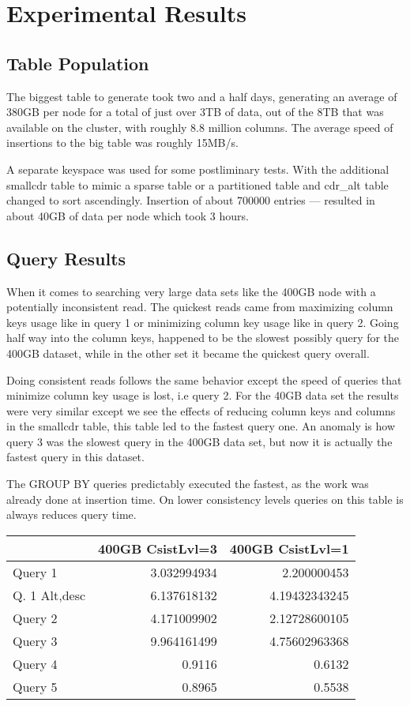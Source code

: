 \documentclass[letterpaper]{article}
\begin{document}
\section{Experimental Results}

\subsection{Table Population}

The biggest table to generate took two and a half days, generating an average
of 380GB per node for a total of just over 3TB of data, out of the 8TB that was
available on the cluster, with roughly 8.8 million columns. 
The average speed of insertions to the big table was roughly 15MB/s.

A separate keyspace was used for some postliminary tests. With the additional smallcdr table
to mimic a sparse table or a partitioned table and cdr\_alt table changed to sort ascendingly. 
Insertion of about 700000 entries --- resulted in about 40GB of data per node which took 3 hours.

\subsection{Query Results}
When it comes to searching very large data sets like the 400GB node with a potentially inconsistent read. 
The quickest reads came from maximizing column keys usage
like in query 1 or minimizing column key usage like in query 2. Going half way into the column keys, 
happened to be the slowest possibly query for the 400GB dataset, while in the other set
it became the quickest query overall. 

Doing consistent reads follows the same behavior except the speed of 
queries that minimize column key usage is lost, i.e query 2.
For the 40GB data set the results were very similar except we see the effects of reducing column keys and
columns in the smallcdr table, this table led to the fastest query one.
An anomaly is how query 3 was the slowest query in the 400GB data set, but now it is actually the 
fastest query in this dataset.

The GROUP BY queries predictably executed the
fastest, as the work was already done at insertion time. 
On lower consistency levels queries on this table is always reduces query time.
\\

\begin{tabular}[h]{|l|r|r|}
\hline
& 400GB CsistLvl=3 & 400GB CsistLvl=1 \\ \hline
Query 1       & 3.032994934 & 2.200000453 \\
Q. 1 Alt,desc   & 6.137618132 & 4.19432343245 \\
Query 2       & 4.171009902 & 2.12728600105 \\
Query 3       & 9.964161499 & 4.75602963368 \\
Query 4       & 0.9116 & 0.6132 \\
Query 5       & 0.8965 & 0.5538 \\\hline
\end{tabular}
\end{document}
